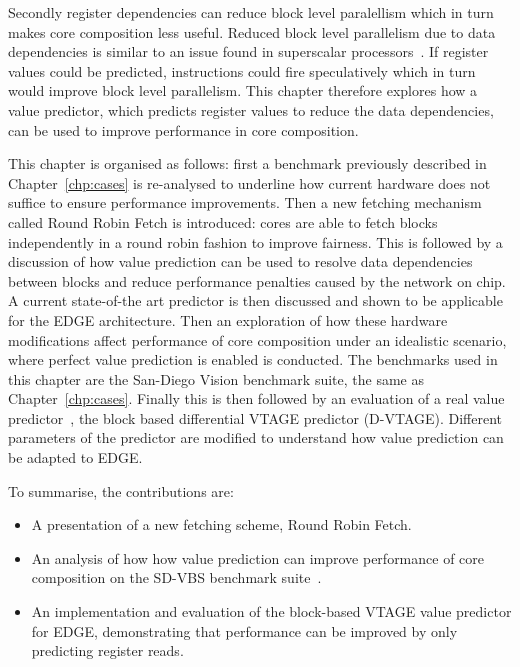 Secondly register dependencies can reduce block level paralellism which in turn makes core composition less useful.
Reduced block level parallelism due to data dependencies is similar to an issue found in superscalar processors~\cite{peraisBeBop2015}.
If register values could be predicted, instructions could fire speculatively which in turn would improve block level parallelism.
This chapter therefore explores how a value predictor, which predicts register values to reduce the data dependencies, can be used to improve performance in core composition.

This chapter is organised as follows: first a benchmark previously described in Chapter~\ref{chp:cases} is re-analysed to underline how current hardware does not suffice to ensure performance improvements.
Then a new fetching mechanism called Round Robin Fetch is introduced: cores are able to fetch blocks independently in a round robin fashion to improve fairness.
This is followed by a discussion of how value prediction can be used to resolve data dependencies between blocks and reduce performance penalties caused by the network on chip.
A current state-of-the art predictor is then discussed and shown to be applicable for the EDGE architecture.
Then an exploration of how these hardware modifications affect performance of core composition under an idealistic scenario, where perfect value prediction is enabled is conducted.
The benchmarks used in this chapter are the San-Diego Vision benchmark suite, the same as Chapter~\ref{chp:cases}.
Finally this is then followed by an evaluation of a real value predictor~\cite{peraisBeBop2015}, the block based differential VTAGE predictor (D-VTAGE).
Different parameters of the predictor are modified to understand how value prediction can be adapted to EDGE.

To summarise, the contributions are:

\vspace{-1em}
\begin{itemize}
\item A presentation of a new fetching scheme, Round Robin Fetch.
\vspace{-1em}
\item An analysis of how how value prediction can improve performance of core composition on the SD-VBS benchmark suite~\cite{sdvbs}.
\item An implementation and evaluation of the block-based VTAGE value predictor for EDGE, demonstrating that performance can be improved by only predicting register reads.
\end{itemize}